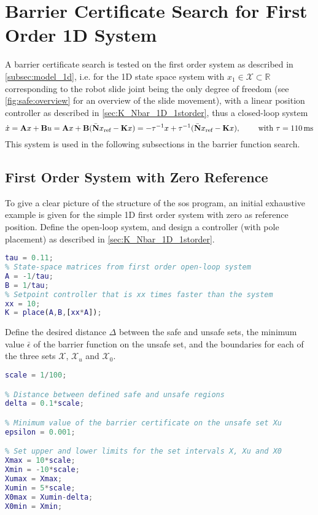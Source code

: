 
\section{Barrier Certificate Search for First Order 1D System}
A barrier certificate search is tested on the first order system as described in \autoref{subsec:model_1d}, i.e. for the  1D state space system with $x_1\in\mathcal{X}\subset\mathbb{R}$ corresponding to the robot slide joint being the only degree of freedom (see \autoref{fig:safe:overview} for an overview of the slide movement), with a linear position controller as described in \autoref{sec:K_Nbar_1D_1storder}, thus a closed-loop system
\begin{equation}
\dot{x} = \textbf{A}x+\textbf{B}u = \textbf{A}x+\textbf{B}(\bar{\mathbf{N}}x_\text{ref}-\textbf{K}x) = %
-\tau^{-1}x+\tau^{-1}(\bar{\mathbf{N}}x_\text{ref}-\textbf{K}x), \kk \text{with }\tau=110\,\text{ms}\label{eq:sos_firstorder}
\end{equation}
This system is used in the following subsections in the barrier function search.

\subsection{First Order System with Zero Reference}\label{subsec:zeroref}
To give a clear picture of the structure of the \gls{sos} program, an initial exhaustive example is given for the simple 1D first order system with zero as reference position.
Define the open-loop system, and design a controller (with pole placement) as described in \autoref{sec:K_Nbar_1D_1storder}.
\begin{lstlisting}[language=matlab]
% Time constant from measurement
tau = 0.11;
% State-space matrices from first order open-loop system
A = -1/tau;
B = 1/tau;
% Setpoint controller that is xx times faster than the system
xx = 10;
K = place(A,B,[xx*A]);
\end{lstlisting}
Define the desired distance $\Delta$ between the safe and unsafe sets,  the minimum value $\bar{\epsilon}$ of the barrier function on the unsafe set, and the boundaries for each of the three sets $\mathcal{X}$, $\mathcal{X}_u$ and $\mathcal{X}_0$. %
\begin{lstlisting}[language=matlab]
% scaling factor = 1/100 for [meter], or 1 for [cm]
scale = 1/100;

% Distance between defined safe and unsafe regions
delta = 0.1*scale;

% Minimum value of the barrier certificate on the unsafe set Xu
epsilon = 0.001;

% Set upper and lower limits for the set intervals X, Xu and X0
Xmax = 10*scale;
Xmin = -10*scale;
Xumax = Xmax;
Xumin = 5*scale;
X0max = Xumin-delta;
X0min = Xmin;
\end{lstlisting}

